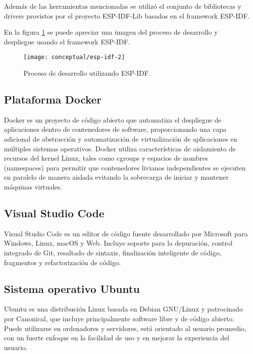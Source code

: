 Además de las herramientas mencionadas se utilizó el conjunto de bibliotecas y drivers provistos por el proyecto ESP-IDF-Lib \cite{esp_idf_lib_website} basados en el framework ESP-IDF.

En la figura \ref{fig:esp-idf} se puede apreciar una imagen del proceso de desarrollo y despliegue usando el framework ESP-IDF.

\begin{figure}[h]
  \centering
  \texttt{[image: conceptual/esp-idf-2]}
  \caption{Proceso de desarrollo utilizando ESP-IDF\protect\footnotemark.}
  \label{fig:esp-idf}
\end{figure}


\subsection{Plataforma Docker}

Docker \cite{docker_website} es un proyecto de código abierto que automatiza el despliegue de aplicaciones dentro de contenedores de software, proporcionando una capa adicional de abstracción y automatización de virtualización de aplicaciones en múltiples sistemas operativos. Docker utiliza características de aislamiento de recursos del kernel Linux, tales como cgroups y espacios de nombres (namespaces) para permitir que contenedores livianos independientes se ejecuten en paralelo de manera aislada evitando la sobrecarga de iniciar y mantener máquinas virtuales.

\subsection{Visual Studio Code}

Visual Studio Code \cite{vscode_website} es un editor de código fuente desarrollado por Microsoft para Windows, Linux, macOS y Web. Incluye soporte para la depuración, control integrado de Git, resaltado de sintaxis, finalización inteligente de código, fragmentos y refactorización de código.


\subsection{Sistema operativo Ubuntu}
Ubuntu \cite{ubuntu_website} es una distribución Linux basada en Debian GNU/Linux y patrocinado por Canonical, que incluye principalmente software libre y de código abierto. Puede utilizarse en ordenadores y servidores, está orientado al usuario promedio, con un fuerte enfoque en la facilidad de uso y en mejorar la experiencia del usuario.








